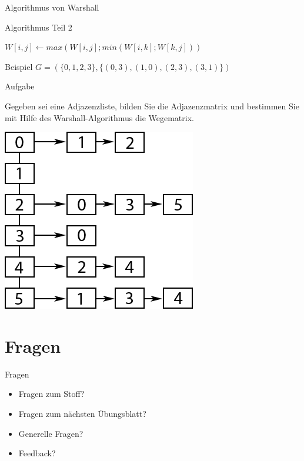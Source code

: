 	
	\begin{frame}{Algorithmus von Warshall}
	
		
		\begin{block}{Algorithmus Teil 2}
            \begin{algorithmic}
							\State $W[i , j ] \gets  max(W[i , j ]; min(W[i , k];W[k, j ]) )$
						\EndFor
					\EndFor
				\EndFor
            \end{algorithmic}
			
		\end{block}
		
		\begin{exampleblock}{Beispiel}
			$G = (\{0,1,2,3\}, \{(0,3), (1,0), (2,3), (3,1)\})$
		\end{exampleblock}
	\end{frame}
	
	
	\begin{frame}{Aufgabe}
		\begin{block}{}
			Gegeben sei eine Adjazenzliste, bilden Sie die Adjazenzmatrix und bestimmen Sie mit Hilfe des Warshall-Algorithmus die Wegematrix.\\
			
		\begin{center}
			\includegraphics[scale=0.5]{graphics/08/adjazenzliste.png}
		\end{center}
			
		\end{block}
	\end{frame}
	
	
	\section{Fragen}
	\begin{frame} {Fragen}
		\begin{itemize}
			\item Fragen zum Stoff?
			\item Fragen zum n\"achsten \"Ubungsblatt?
			\item Generelle Fragen?
			\item Feedback?
		\end{itemize}
	\end{frame}


